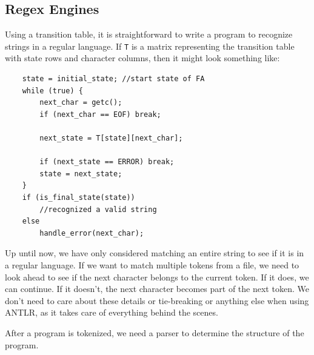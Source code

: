 \subsection{Regex Engines}

Using a transition table, it is straightforward 
to write a program to recognize strings in a regular 
language. If \texttt{T} is a matrix representing 
the transition table with state rows and character
columns, then it might look something like:
\begin{lstlisting}
    state = initial_state; //start state of FA
    while (true) {
        next_char = getc();
        if (next_char == EOF) break;

        next_state = T[state][next_char];

        if (next_state == ERROR) break;
        state = next_state;
    }
    if (is_final_state(state))
        //recognized a valid string
    else
        handle_error(next_char);
\end{lstlisting}

Up until now, we have only considered matching an entire string
to see if it is in a regular language.
If we want to match multiple tokens from a file,
we need to look ahead to see if the next character belongs to the
current token. If it does, we can continue. 
If it doesn't, the next character becomes part of 
the next token. We don't need to care about these 
details or tie-breaking or anything else when using 
ANTLR, as it takes care of everything behind the scenes.

After a program is tokenized, we need a parser to 
determine the structure of the program. 